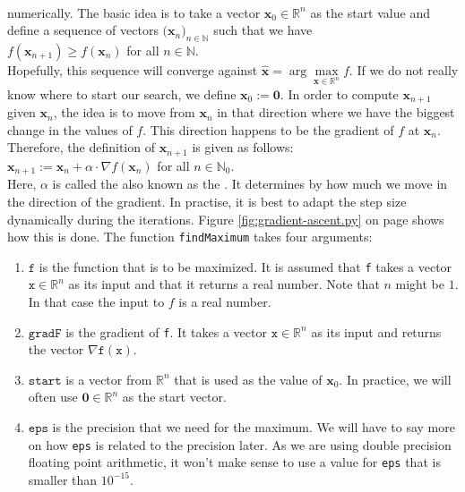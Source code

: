\\[0.2cm]
numerically.  The basic idea is to take a vector $\mathbf{x}_0 \in \mathbb{R}^n$ as the start value and define a sequence of
vectors $\bigl(\mathbf{x}_n\bigr)_{n\in\mathbb{N}}$ such that we have
\\[0.2cm]
\hspace*{1.3cm}
$f(\mathbf{x}_{n+1}) \geq f(\mathbf{x}_{n})$ \quad for all $n\in\mathbb{N}$.
\\[0.2cm]
Hopefully, this sequence will converge against $\widehat{\mathbf{x}} = \arg\max\limits_{\mathbf{x}\in \mathbb{R}^n}f$.
If we do not really know where to start our search, we define $\mathbf{x}_0 := \mathbf{0}$.  In order to
compute $\mathbf{x}_{n+1}$ given $\mathbf{x}_{n}$, the idea is to move from $\mathbf{x}_n$ in that direction
where we have the biggest change in the values of $f$.   This direction happens to be the gradient of $f$ at $\mathbf{x}_n$.
Therefore, the definition of $\mathbf{x}_{n+1}$ is given as follows:
\\[0.2cm]
\hspace*{1.3cm}
$\mathbf{x}_{n+1} := \mathbf{x}_n + \alpha \cdot \nabla f(\mathbf{x}_n)$ \quad for all $n \in \mathbb{N}_0$.
\\[0.2cm]
Here, $\alpha$ is called the  also known as the .  It determines by how
much we move in the direction of the gradient.  In practise, it is best to adapt the step size dynamically
during the iterations.  Figure \ref{fig:gradient-ascent.py} on page \pageref{fig:gradient-ascent.py} shows
how this is done. 
The function \texttt{findMaximum} takes four arguments:
\begin{enumerate}
\item $\texttt{f}$ is the function that is to be maximized.  It is assumed that \texttt{f} takes a vector
      $\texttt{x}\in \mathbb{R}^n$ as its input and that it returns a real number.  Note that $n$ might be
      $1$.  In that case the input to $f$ is a real number.
\item $\texttt{gradF}$ is the gradient of \texttt{f}.  It takes a vector
      $\texttt{x}\in \mathbb{R}^n$ as its input and returns the vector $\nabla \mathtt{f}(\mathtt{x})$.
\item $\texttt{start}$ is a vector from $\mathbb{R}^n$ that is used as the value of $\mathbf{x}_0$.  In
      practice, we will often use $\mathbf{0} \in \mathbb{R}^n$ as the start vector.
\item $\texttt{eps}$ is the precision that we need for the maximum.  We will have to say more on how \texttt{eps}
      is related to the precision later.  As we are using double precision floating point arithmetic, 
      it won't make sense to use a value for \texttt{eps} that is smaller than $10^{-15}$.
\end{enumerate}

